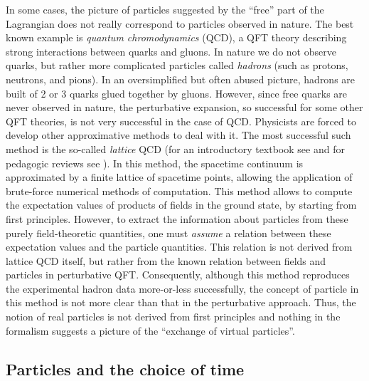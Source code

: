 \documentclass[12pt]{article}
\begin{document}
In some cases, the picture of particles suggested by the 
``free'' part of the Lagrangian does not really correspond 
to particles observed in nature. The best known 
example is {\em quantum chromodynamics} (QCD), a QFT theory 
describing strong interactions between quarks and gluons.
In nature we do not observe quarks, but rather more complicated
particles called {\em hadrons} (such as protons, neutrons, 
and pions). In an oversimplified but often abused picture, 
hadrons are built of 2 or 3 quarks glued together
by gluons. However, since free quarks are never observed in nature,
the perturbative expansion, so successful for some other 
QFT theories, is not very successful in the case of QCD.
Physicists are forced to develop other approximative 
methods to deal with it. The most successful such method 
is the so-called {\em lattice} QCD (for an introductory 
textbook see \cite{creutz} and for pedagogic reviews
see \cite{davies,sharpe}). In this method, the spacetime 
continuum is approximated by a finite lattice
of spacetime points, allowing the application 
of brute-force numerical methods of computation.
This method allows to compute the expectation values of 
products of fields in the ground state, by starting from first 
principles. However, to extract the information about 
particles from these purely field-theoretic quantities, one must 
{\em assume} a relation between these expectation values
and the particle quantities. This relation is not derived 
from lattice QCD itself, but rather from the known 
relation between fields and particles in perturbative QFT.  
Consequently, although this method reproduces the experimental
hadron data more-or-less successfully, 
the concept of particle in this method is 
not more clear than that in the perturbative approach.
Thus, the notion of real particles
is not derived from first principles
and nothing in the formalism 
suggests a picture of the ``exchange of virtual particles''.         

\subsection{Particles and the choice of time}
\end{document}
